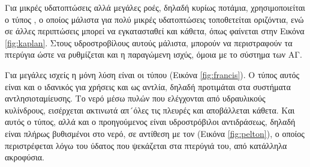\documentclass[12pt]{report}
\begin{document}
Για μικρές υδατοπτώσεις αλλά μεγάλες ροές, δηλαδή κυρίως ποτάμια, χρησιμοποιείται ο τύπος {}, ο οποίος μάλιστα για πολύ μικρές υδατοπτώσεις τοποθετείται οριζόντια, 
ενώ σε άλλες περιπτώσεις μπορεί να εγκατασταθεί και κάθετα, όπως φαίνεται στην Εικόνα \ref{fig:kaplan}. Στους υδροστροβίλους αυτούς μάλιστα, μπορούν να περιστραφούν τα πτερύγια ώστε να ρυθμίζεται και η παραγώμενη ισχύς, όμοια με
το σύστημα {} των ΑΓ.

Για μεγάλες ισχείς η μόνη λύση είναι οι τύπου {} (Εικόνα \ref{fig:francis}). Ο τύπος αυτός είναι και ο ιδανικός για χρήσεις και ως αντλία, δηλαδή προτιμάται στα συστήματα αντλησιοταμίευσης. 
Το νερό μέσω πυλών που ελέγχονται από υδραυλικούς κυλίνδρους, εισέρχεται ακτινωτά απ´όλες τις πλευρές και αποβάλλεται κάθετα.
Και αυτός ο τύπος, αλλά και ο προηγούμενος είναι υδροστρόβιλοι αντιδράσεως, δηλαδή είναι πλήρως βυθισμένοι στο νερό, σε αντίθεση με τον {} (Εικόνα \ref{fig:pelton}), ο οποίος περιστρέφεται λόγω του ύδατος που 
ψεκάζεται στα πτερύγιά του, από κατάλληλα ακροφύσια.
\end{document}
